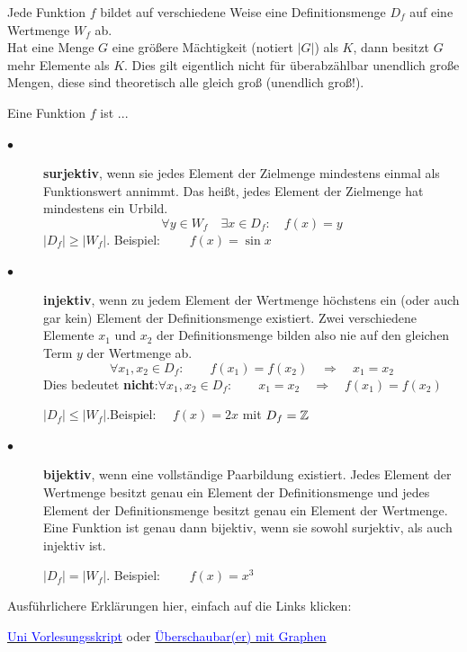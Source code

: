 \documentclass[main.tex]{subfiles}
\begin{document}
\begin{Definition}
	Jede Funktion $f$ bildet auf verschiedene Weise eine Definitionsmenge $D_{f}$ auf eine Wertmenge $W_{f}$ ab. \\Hat eine Menge $G$ eine größere Mächtigkeit (notiert $|G|$) als $K$, dann besitzt $G$ mehr Elemente als $K$. Dies gilt eigentlich nicht für überabzählbar unendlich große Mengen, diese sind theoretisch alle gleich groß (unendlich groß!).

	Eine Funktion $f$ ist ...
	\begin{description}
		\item[$\bullet$] \textbf{surjektiv}, wenn sie jedes Element der Zielmenge mindestens einmal als Funktionswert annimmt. Das heißt, jedes Element der Zielmenge hat mindestens ein Urbild.
		$$\forall y \in W_{f} \quad \exists x \in D_{f}:\quad f(x)=y $$
		$|D_{f}| \geq |W_{f}|$. \quad Beispiel: $\qquad f(x)=\sin{x} $

		\item[$\bullet$] \textbf{injektiv}, wenn zu jedem Element der Wertmenge höchstens ein (oder auch gar kein) Element der Definitionsmenge existiert. Zwei verschiedene Elemente $x_{1}$ und $x_{2}$ der Definitionsmenge bilden also nie auf den gleichen Term $y$ der Wertmenge ab.
		$$\forall x_{1}, x_{2} \in D_{f} :\qquad f(x_{1}) = f(x_{2}) \quad \Rightarrow \quad x_{1}=x_{2} $$
		\danger \quad Dies bedeutet \textbf{nicht}:\quad $\forall x_{1}, x_{2} \in D_{f} :\qquad x_{1} = x_{2} \quad\Rightarrow\quad f(x_{1}) = f(x_{2}) $
		
		$|D_{f}| \leq |W_{f}|$.\quad Beispiel: $\quad f(x)=2x$ \quad mit \quad $D_{f}=\mathbb{Z}$

		\item[$\bullet$] \textbf{bijektiv}, wenn eine vollständige Paarbildung existiert. Jedes Element der Wertmenge besitzt genau ein Element der Definitionsmenge und jedes Element der Definitionsmenge besitzt genau ein Element der Wertmenge. Eine Funktion ist genau dann bijektiv, wenn sie sowohl surjektiv, als auch injektiv ist.

		$|D_{f}| = |W_{f}|$. \quad Beispiel: $\qquad f(x)=x^3 $
	\end{description}
\end{Definition}

\begin{Bemerkung}
	Ausführlichere Erklärungen hier, einfach auf die Links klicken:

	\href{http://www.math.uni-konstanz.de/~huynh/Vorkurs2015/Vorlesung_12.pdf}{\textcolor{blue}{Uni Vorlesungsskript}} oder
	\href{https://www.mathe-online.at/mathint/fun1/i_isb.html}{\textcolor{blue}{Überschaubar(er) mit Graphen}} \\
\end{Bemerkung}
\end{document}
